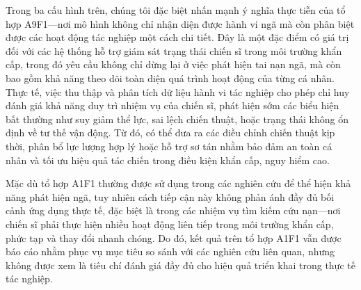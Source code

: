 

Trong ba cấu hình trên, chúng tôi đặc biệt nhấn mạnh ý nghĩa thực tiễn của tổ hợp A9F1—nơi mô hình không chỉ nhận diện được hành vi ngã mà còn phân biệt được các hoạt động tác nghiệp một cách chi tiết. Đây là một đặc điểm có giá trị đối với các hệ thống hỗ trợ giám sát trạng thái chiến sĩ trong môi trường khẩn cấp, trong đó yêu cầu không chỉ dừng lại ở việc phát hiện tai nạn ngã, mà còn bao gồm khả năng theo dõi toàn diện quá trình hoạt động của từng cá nhân. Thực tế, việc thu thập và phân tích dữ liệu hành vi tác nghiệp cho phép chỉ huy đánh giá khả năng duy trì nhiệm vụ của chiến sĩ, phát hiện sớm các biểu hiện bất thường như suy giảm thể lực, sai lệch chiến thuật, hoặc trạng thái không ổn định về tư thế vận động. Từ đó, có thể đưa ra các điều chỉnh chiến thuật kịp thời, phân bổ lực lượng hợp lý hoặc hỗ trợ sơ tán nhằm bảo đảm an toàn cá nhân và tối ưu hiệu quả tác chiến trong điều kiện khẩn cấp, nguy hiểm cao.

Mặc dù tổ hợp A1F1 thường được sử dụng trong các nghiên cứu để thể hiện khả năng phát hiện ngã, tuy nhiên cách tiếp cận này không phản ánh đầy đủ bối cảnh ứng dụng thực tế, đặc biệt là trong các nhiệm vụ tìm kiếm cứu nạn—nơi chiến sĩ phải thực hiện nhiều hoạt động liên tiếp trong môi trường khẩn cấp, phức tạp và thay đổi nhanh chóng. Do đó, kết quả trên tổ hợp A1F1 vẫn được báo cáo nhằm phục vụ mục tiêu so sánh với các nghiên cứu liên quan, nhưng không được xem là tiêu chí đánh giá đầy đủ cho hiệu quả triển khai trong thực tế tác nghiệp.

